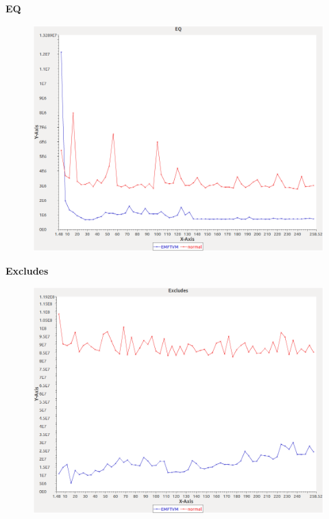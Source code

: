 \noindent\textbf{EQ}

\begin{figure}[h]
\centering
\includegraphics[width=\textwidth]{../graphs/sequence/EQ}
\end{figure}
\pagebreak

\noindent\textbf{Excludes}

\begin{figure}[h]
\centering
\includegraphics[width=\textwidth]{../graphs/sequence/Excludes}
\end{figure}
\pagebreak

